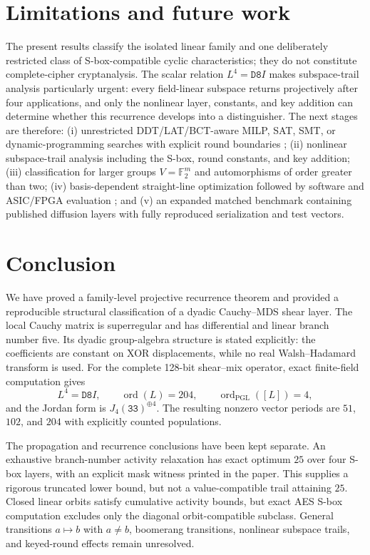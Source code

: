 \documentclass[10pt,reqno]{amsart}
\theoremstyle{plain}
\theoremstyle{remark}\newtheorem{remark}[theorem]{Remark}
\theoremstyle{definition}\newtheorem{definition}[theorem]{Definition}
\newcommand{\F}{\mathbb F}
\newcommand{\ord}{\operatorname{ord}}
\newcommand{\hex}[1]{\mathtt{#1}}
\begin{document}
\section{Limitations and future work}
The present results classify the isolated linear family and one deliberately restricted class of S-box-compatible cyclic characteristics; they do not constitute complete-cipher cryptanalysis. The scalar relation $L^4=\hex{D8}I$ makes subspace-trail analysis particularly urgent: every field-linear subspace returns projectively after four applications, and only the nonlinear layer, constants, and key addition can determine whether this recurrence develops into a distinguisher. The next stages are therefore: (i) unrestricted DDT/LAT/BCT-aware MILP, SAT, SMT, or dynamic-programming searches with explicit round boundaries \cite{Mouha2011,Sun2014,SasakiTodo2017}; (ii) nonlinear subspace-trail analysis including the S-box, round constants, and key addition; (iii) classification for larger groups $V=\F_2^m$ and automorphisms of order greater than two; (iv) basis-dependent straight-line optimization followed by software and ASIC/FPGA evaluation \cite{BoyarPeralta2010,BeierleKranzLeander2016}; and (v) an expanded matched benchmark containing published diffusion layers with fully reproduced serialization and test vectors.

\section{Conclusion}
We have proved a family-level projective recurrence theorem and provided a reproducible structural classification of a dyadic Cauchy--MDS shear layer. The local Cauchy matrix is superregular and has differential and linear branch number five. Its dyadic group-algebra structure is stated explicitly: the coefficients are constant on XOR displacements, while no real Walsh--Hadamard transform is used. For the complete 128-bit shear--mix operator, exact finite-field computation gives
\[
L^4=\hex{D8}I,\qquad \ord(L)=204,
\qquad \ord_{\mathrm{PGL}}([L])=4,
\]
and the Jordan form is $J_4(\hex{33})^{\oplus4}$. The resulting nonzero vector periods are $51$, $102$, and $204$ with explicitly counted populations.

The propagation and recurrence conclusions have been kept separate. An exhaustive branch-number activity relaxation has exact optimum $25$ over four S-box layers, with an explicit mask witness printed in the paper. This supplies a rigorous truncated lower bound, but not a value-compatible trail attaining $25$. Closed linear orbits satisfy cumulative activity bounds, but exact AES S-box computation excludes only the diagonal orbit-compatible subclass. General transitions $a\mapsto b$ with $a\ne b$, boomerang transitions, nonlinear subspace trails, and keyed-round effects remain unresolved.
\end{document}
